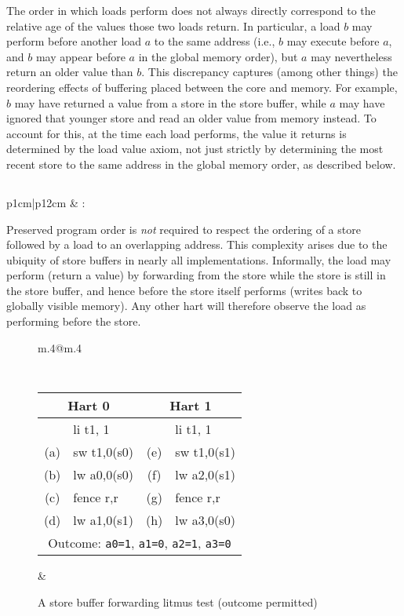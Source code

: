The order in which loads perform does not always directly correspond to the relative age of the values those two loads return.
In particular, a load $b$ may perform before another load $a$ to the same address (i.e., $b$ may execute before $a$, and $b$ may appear before $a$ in the global memory order), but $a$ may nevertheless return an older value than $b$.
This discrepancy captures (among other things) the reordering effects of buffering placed between the core and memory.
For example, $b$ may have returned a value from a store in the store buffer, while $a$ may have ignored that younger store and read an older value from memory instead.
To account for this, at the time each load performs, the value it returns is determined by the load value axiom, not just strictly by determining the most recent store to the same address in the global memory order, as described below.

\subsection{}
\label{sec:memory:loadvalueaxiom}
\begin{tabular}{p{1cm}|p{12cm}} &
: \loadvalueaxiom
\end{tabular}

Preserved program order is {\em not} required to respect the ordering of a store followed by a load to an overlapping address.
This complexity arises due to the ubiquity of store buffers in nearly all implementations.
Informally, the load may perform (return a value) by forwarding from the store while the store is still in the store buffer, and hence before the store itself performs (writes back to globally visible memory).
Any other hart will therefore observe the load as performing before the store.

\begin{figure}[h!]
  \centering
  \begin{tabular}{m{.4\linewidth}@{\qquad}m{.4\linewidth}}
  {
    \tt\small
    \begin{tabular}{cl||cl}
    \multicolumn{2}{c}{Hart 0} & \multicolumn{2}{c}{Hart 1} \\
    \hline
          & li t1, 1    &     & li t1, 1    \\
      (a) & sw t1,0(s0) & (e) & sw t1,0(s1) \\
      (b) & lw a0,0(s0) & (f) & lw a2,0(s1) \\
      (c) & fence r,r   & (g) & fence r,r   \\
      (d) & lw a1,0(s1) & (h) & lw a3,0(s0) \\
      \hline
      \multicolumn{4}{c}{Outcome: {\tt a0=1}, {\tt a1=0}, {\tt a2=1}, {\tt a3=0}}
    \end{tabular}
  }
  &
  
  \end{tabular}
  \caption{A store buffer forwarding litmus test (outcome permitted)}
  \label{fig:litmus:storebuffer}
\end{figure}

